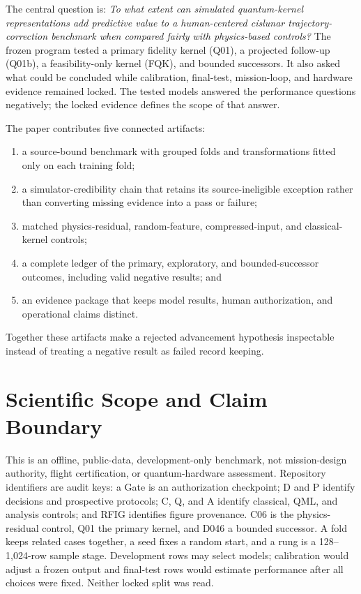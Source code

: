 The central question is: \emph{To what extent can simulated quantum-kernel
representations add predictive value to a human-centered cislunar
trajectory-correction benchmark when compared fairly with physics-based
controls?} The frozen program tested a primary fidelity kernel (Q01), a
projected follow-up (Q01b), a feasibility-only kernel (FQK), and bounded
successors. It also asked what could be concluded while calibration,
final-test, mission-loop, and hardware evidence remained locked. The tested
models answered the performance questions negatively; the locked evidence
defines the scope of that answer.

The paper contributes five connected artifacts:
\begin{enumerate}
\item a source-bound benchmark with grouped folds and transformations fitted
only on each training fold;
\item a simulator-credibility chain that retains its source-ineligible
exception rather than converting missing evidence into a pass or failure;
\item matched physics-residual, random-feature, compressed-input, and
classical-kernel controls;
\item a complete ledger of the primary, exploratory, and bounded-successor
outcomes, including valid negative results; and
\item an evidence package that keeps model results, human authorization, and
operational claims distinct.
\end{enumerate}
Together these artifacts make a rejected advancement hypothesis inspectable
instead of treating a negative result as failed record keeping.

\section{Scientific Scope and Claim Boundary}
\label{sec:scope}

This is an offline, public-data, development-only benchmark, not mission-design
authority, flight certification, or quantum-hardware assessment. Repository
identifiers are audit keys: a Gate is an authorization checkpoint; D and P
identify decisions and prospective protocols; C, Q, and A identify classical,
QML, and analysis controls; and RFIG identifies figure provenance. C06 is the
physics-residual control, Q01 the primary kernel, and D046 a bounded successor.
A fold keeps related cases together, a seed fixes a random start, and a rung is
a 128--1,024-row sample stage. Development rows may select models; calibration
would adjust a frozen output and final-test rows would estimate performance
after all choices were fixed. Neither locked split was read.

